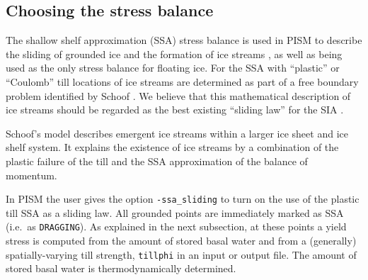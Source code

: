 \begin{comment}
\opt{shelfext\und} When computing ice shelf and stream velocity, PISM enforces boundary conditions using a fictitious extension of the ice shelf over the entire domain.  This extension provides strength only, it does not change the mass, driving force, or location of the calving front.  By default, it's strength will be computed using the current ice type at reference thickness, temperature, and strain rate, customizable using \texttt{-shelfext_H} (5 meters by default), \texttt{-shelfext_T} (263.15 K), \texttt{-shelfext_Du} (1 m/a per km).  The extension strength is used whenever ice thickness is less than the extension thickness to prevent the equations from becoming singular.  You can also specify the extension strength directly using \texttt{-shelfext_force_nuH} with units in Pa s.  Finally, you can compute strength using a \texttt{custom} ice type the ice used in the rest of PISM by giving \texttt{-shelfext_use_private_ice}.  This option will gives you a \texttt{custom} ice type which you can control via \texttt{-shelfext_ice_custom_} (see \texttt{-ice_type}).  All \texttt{-shelfext} options are displayed in \texttt{-help}.
\end{comment}


\subsection{Choosing the stress balance}  \label{subsect:ssacontrol}

The shallow shelf approximation (SSA) stress balance is used in PISM to describe the sliding of grounded ice and the formation of ice streams \cite{BBssasliding}, as well as being used as the only stress balance for floating ice.  For the SSA with ``plastic'' or ``Coulomb'' till locations of ice streams are determined as part of a free boundary problem identified by Schoof \cite{SchoofStream}.  We believe that this mathematical description of ice streams should be regarded as the best existing ``sliding law'' for the SIA \cite{BBssasliding}.

Schoof's model \cite{SchoofStream} describes emergent ice streams within a larger ice sheet and ice shelf system.  It explains the existence of ice streams by a combination of the plastic failure of the till and the SSA approximation of the balance of momentum.  

In PISM the user gives the option \texttt{-ssa_sliding} to turn on the use of the plastic till SSA as a sliding law.  All grounded points are immediately marked as SSA (i.e.~as \texttt{DRAGGING}).  As explained in the next subsection, at these points a yield stress is computed from the amount of stored basal water and from a (generally) spatially-varying till strength, \texttt{tillphi} in an input or output file.  The amount of stored basal water is thermodynamically determined.

